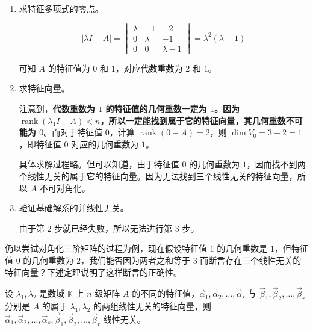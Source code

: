 \begin{solve}
	\begin{enumerate}
		\item 求特征多项式的零点。

		$$
		|\lambda I - A| = \begin{vmatrix} \lambda & -1 & -2 \\ 0 & \lambda & -1 \\ 0 & 0 & \lambda - 1 \end{vmatrix} = \lambda^2(\lambda - 1)
		$$

		可知 $A$ 的特征值为 $0$ 和 $1$，对应代数重数为 $2$ 和 $1$。

		\item 求特征向量。

		注意到，\textbf{代数重数为 $1$ 的特征值的几何重数一定为 $1$。因为 $\operatorname{rank} (\lambda_1 I - A) < n$，所以一定能找到属于它的特征向量，其几何重数不可能为 $0$}。而对于特征值 $0$，计算 $\operatorname{rank}(0 - A) = 2$，则 $\dim V_0 = 3 - 2 = 1$，即特征值 $0$ 对应的几何重数为 $1$。

		具体求解过程略。但可以知道，由于特征值 $0$ 的几何重数为 $1$，因而找不到两个线性无关的属于它的特征向量。因为无法找到三个线性无关的特征向量，所以 $A$ 不可对角化。

		\item 验证基础解系的并线性无关。

		由于第 2 步就已经失败，所以无法进行第 3 步。
	\end{enumerate}
\end{solve}

仍以尝试对角化三阶矩阵的过程为例，现在假设特征值 $1$ 的几何重数是 $1$，但特征值 $0$ 的几何重数为 $2$，我们能否因为两者之和等于 $3$ 而断言存在三个线性无关的特征向量？下述定理说明了这样断言的正确性。

\begin{theorem}
	设 $\lambda_1, \lambda_2$ 是数域 $\mathbb K$ 上 $n$ 级矩阵 $A$ 的不同的特征值，$\vec \alpha_1, \vec \alpha_2, \ldots, \vec \alpha_s$ 与 $\vec \beta_1, \vec \beta_2, \ldots, \vec \beta_r$ 分别是 $A$ 的属于 $\lambda_1, \lambda_2$ 的两组线性无关的特征向量，则 $\vec \alpha_1, \vec \alpha_2, \ldots, \vec \alpha_s, \vec \beta_1, \vec \beta_2, \ldots, \vec \beta_r$ 线性无关。
\end{theorem}

